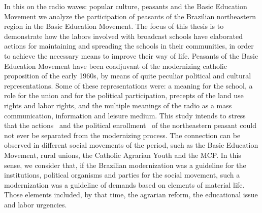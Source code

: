 In this on the radio waves: popular culture, peasants and the Basic Education Movement we analyze the participation of peasants of the Brazilian northeastern region in the Basic Education Movement. The focus of this thesis is to demonstrate how the labors involved with broadcast schools have elaborated actions for maintaining and spreading the schools in their communities, in order to achieve the necessary means to improve their way of life. Peasants of the Basic Education Movement have been coadjuvant of the modernizing catholic proposition of the early 1960s, by means of quite peculiar political and cultural representations. Some of these representations were: a meaning for the school, a role for the union and for the political participation, precepts of the land use rights and labor rights, and the multiple meanings of the radio as a mass communication, information and leisure medium. This study intends to stress that the actions \textendash\ and the political enrollment \textendash\ of the northeastern peasant could not ever be separated from the modernizing process. The connection can be observed in different social movements of the period, such as the Basic Education Movement, rural unions, the Catholic Agrarian Youth and the MCP. In this sense, we consider that, if the Brazilian modernization was a guideline for the institutions, political organisms and parties for the social movement, such a modernization was a guideline of demands based on elements of material life. Those elements included, by that time, the agrarian reform, the educational issue and labor urgencies.

